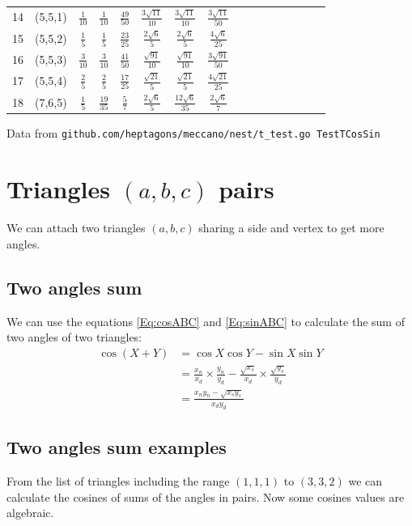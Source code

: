 \documentclass[11pt]{article}
\begin{document}
\begin{longtable}{ | p{1cm}| *{15}{c|} }
14 & (5,5,1) & $\frac{1}{10}$ & $\frac{1}{10}$ & $\frac{49}{50}$ & $\frac{3\sqrt{11}}{10}$ & $\frac{3\sqrt{11}}{10}$ & $\frac{3\sqrt{11}}{50}$\\
15 & (5,5,2) & $\frac{1}{5}$ & $\frac{1}{5}$ & $\frac{23}{25}$ & $\frac{2\sqrt{6}}{5}$ & $\frac{2\sqrt{6}}{5}$ & $\frac{4\sqrt{6}}{25}$\\
16 & (5,5,3) & $\frac{3}{10}$ & $\frac{3}{10}$ & $\frac{41}{50}$ & $\frac{\sqrt{91}}{10}$ & $\frac{\sqrt{91}}{10}$ & $\frac{3\sqrt{91}}{50}$\\
17 & (5,5,4) & $\frac{2}{5}$ & $\frac{2}{5}$ & $\frac{17}{25}$ & $\frac{\sqrt{21}}{5}$ & $\frac{\sqrt{21}}{5}$ & $\frac{4\sqrt{21}}{25}$\\
18 & (7,6,5) & $\frac{1}{5}$ & $\frac{19}{35}$ & $\frac{5}{7}$ & $\frac{2\sqrt{6}}{5}$ & $\frac{12\sqrt{6}}{35}$ & $\frac{2\sqrt{6}}{7}$\\
\end{longtable}
Data from \texttt{github.com/heptagons/meccano/nest/t\_test.go TestTCosSin}




\section{Triangles $(a,b,c)$ pairs}

We can attach two triangles $(a,b,c)$ sharing a side and vertex to get more angles.

\subsection{Two angles sum}
We can use the equations \ref{Eq:cosABC} and \ref{Eq:sinABC} to calculate the sum of two angles of two triangles:
\begin{align}
\cos{(X+Y)} &= \cos{X}\cos{Y} - \sin{X}\sin{Y} \nonumber\\
 &= \frac{x_n}{x_d} \times \frac{y_n}{y_d} - \frac{\sqrt{x_s}}{x_d} \times \frac{\sqrt{y_s}}{y_d} \nonumber\\
 &= \frac{x_ny_n - \sqrt{x_sy_s}}{x_dy_d}
\end{align}

\subsection{Two angles sum examples}
From the list of triangles including the range $(1,1,1)$ to $(3,3,2)$
we can calculate the cosines of sums of the angles in pairs. Now some cosines values are algebraic.
\end{document}
